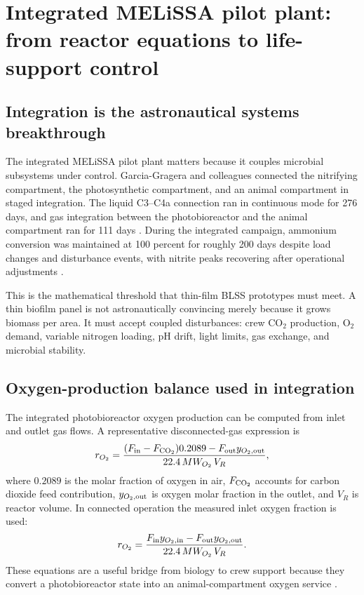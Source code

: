 \documentclass[11pt]{article}
\newcommand{\MEL}{MELiSSA}
\begin{document}
\section{Integrated \MEL{} pilot plant: from reactor equations to life-support control}

\subsection{Integration is the astronautical systems breakthrough}

The integrated \MEL{} pilot plant matters because it couples microbial subsystems under control. Garcia-Gragera and colleagues connected the nitrifying compartment, the photosynthetic compartment, and an animal compartment in staged integration. The liquid C3--C4a connection ran in continuous mode for 276 days, and gas integration between the photobioreactor and the animal compartment ran for 111 days \parencite[5, 8]{garcia2021}. During the integrated campaign, ammonium conversion was maintained at 100 percent for roughly 200 days despite load changes and disturbance events, with nitrite peaks recovering after operational adjustments \parencite[11, 13]{garcia2021}.

This is the mathematical threshold that thin-film BLSS prototypes must meet. A thin biofilm panel is not astronautically convincing merely because it grows biomass per area. It must accept coupled disturbances: crew CO$_2$ production, O$_2$ demand, variable nitrogen loading, pH drift, light limits, gas exchange, and microbial stability.

\subsection{Oxygen-production balance used in integration}

The integrated photobioreactor oxygen production can be computed from inlet and outlet gas flows. A representative disconnected-gas expression is
\begin{equation}
  r_{O_2}=\frac{(F_{\rm in}-F_{\ce{CO2}})0.2089-F_{\rm out}y_{O_2,\rm out}}
  {22.4\,MW_{O_2}\,V_R},
  \label{eq:oxygen_unconnected}
\end{equation}
where $0.2089$ is the molar fraction of oxygen in air, $F_{\ce{CO2}}$ accounts for carbon dioxide feed contribution, $y_{O_2,\rm out}$ is oxygen molar fraction in the outlet, and $V_R$ is reactor volume. In connected operation the measured inlet oxygen fraction is used:
\begin{equation}
  r_{O_2}=\frac{F_{\rm in}y_{O_2,\rm in}-F_{\rm out}y_{O_2,\rm out}}
  {22.4\,MW_{O_2}\,V_R}.
  \label{eq:oxygen_connected}
\end{equation}
These equations are a useful bridge from biology to crew support because they convert a photobioreactor state into an animal-compartment oxygen service \parencite[5]{garcia2021}.
\end{document}
